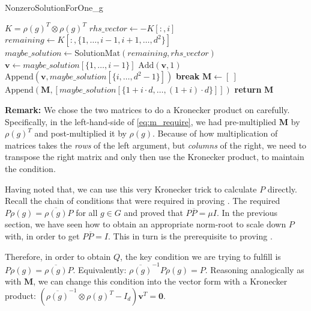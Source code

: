 \documentclass[11pt]{article}
\begin{document}
\begin{algorithm}
  \caption{NonzeroSolutionForOne\_g}
  \label{alg:nonzero}
  \begin{algorithmic}
    \State $K = \rho(g)^T \otimes \rho(g)^T$ 
      \State $rhs\_vector \gets -K[:,i]$ 
      \State $remaining \gets K[:,\{1, \ldots, i-1, i+1, \ldots, d^2\}]$ 
      \State $maybe\_solution \gets \text{SolutionMat}(remaining, rhs\_vector)$
       
        \State $\mathbf{v} \gets maybe\_solution[\{1, \ldots, i-1\}]$
        \State $\text{Add}(\mathbf{v}, 1)$ 
        \State $\text{Append}(\mathbf{v},maybe\_solution[\{i, \ldots, d^2-1\}])$
        \State \textbf{break}
      \EndIf
    \EndFor
    \State $\mathbf{M} \gets [~]$ 
      \State $\text{Append}(\mathbf{M}, [maybe\_solution[\{1+i\cdot d, \ldots, (1+i)\cdot d\}]])$
    \EndFor
    \State \textbf{return} $\mathbf{M}$
  \end{algorithmic}
\end{algorithm}

\textbf{Remark:} We chose the two matrices to do a Kronecker product on carefully. Specifically,
in the left-hand-side of \cref{eq:m_require}, we had pre-multiplied $\mathbf{M}$ by $\rho(g)^T$
and post-multiplied it by $\rho(g)$. Because of how multiplication of matrices takes the \textit{rows}
of the left argument, but \textit{columns} of the right, we need to transpose the right matrix
and only then use the Kronecker product, to maintain the condition.

Having noted that, we can use this very Kronecker trick to calculate $P$ directly. Recall the chain
of conditions that were required in proving \cite[Lemma 3.2, 3.3]{Pas21}. The \cite[Lemma 3.2]{Pas21}
required $P\rho(g) = \overline{\rho(g)}P$ for all $g\in G$ and proved that
$P\overline{P} = \mu I$. In the previous section, we have seen how to obtain an
appropriate norm-root to scale down $P$ with, in order to get $P\overline{P} = I$.
This in turn is the prerequisite to proving \cite[Lemma 3.3]{Pas21}.

Therefore, in order to obtain $Q$, the key condition we are trying to
fulfill is $P\rho(g) = \overline{\rho(g)}P$. Equivalently:
$\overline{\rho(g)}^{-1}P\rho(g) = P$. Reasoning analogically as with $\mathbf{M}$,
we can change this condition into the vector form with a Kronecker product:
$\left(\overline{\rho(g)}^{-1} \otimes \rho(g)^T - I_d\right)\mathbf{v}^T = \mathbf{0}$.
\end{document}
